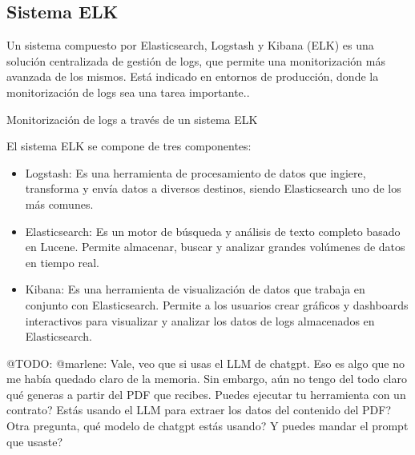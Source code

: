 \subsection*{Sistema ELK}
Un sistema compuesto por Elasticsearch, Logstash y Kibana (ELK) es una solución centralizada de gestión de logs, que
permite una monitorización más avanzada de los mismos.
Está indicado en entornos de producción, donde la monitorización de logs sea una tarea importante..


Monitorización de logs a través de un sistema ELK

El sistema ELK se compone de tres componentes:

\begin{itemize}
    \item
    Logstash: Es una herramienta de procesamiento de datos que ingiere, transforma y envía datos a diversos destinos,
    siendo Elasticsearch uno de los más comunes.
    \item
    Elasticsearch: Es un motor de búsqueda y análisis de texto completo basado en Lucene. Permite almacenar, buscar y
    analizar grandes volúmenes de datos en tiempo real.
    \item Kibana: Es una herramienta de visualización de datos que trabaja en conjunto con Elasticsearch. Permite a los
    usuarios crear gráficos y dashboards interactivos para visualizar y analizar los datos de logs almacenados en
    Elasticsearch.
\end{itemize}

\colorbox{color_highlight}{@TODO: @marlene:}
Vale, veo que si usas el LLM de chatgpt. Eso es algo que no me había quedado claro de la memoria. Sin embargo, aún
no
tengo del todo claro qué generas a partir del PDF que recibes. Puedes ejecutar tu herramienta con un contrato? Estás
usando el LLM para extraer los datos del contenido del PDF? Otra pregunta, qué modelo de chatgpt estás usando? Y
puedes
mandar el prompt que usaste?